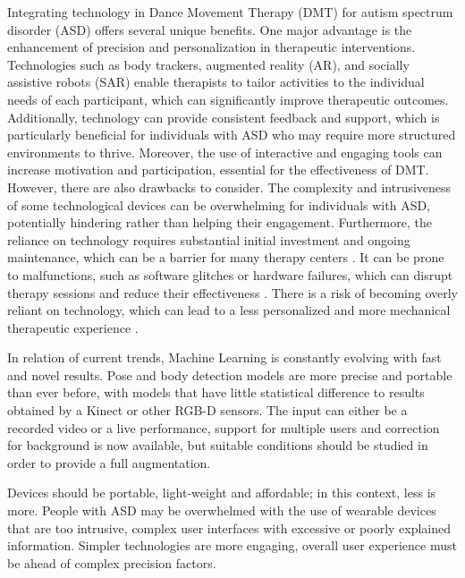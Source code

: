 \documentclass[a4paper,fleqn]{cas-sc}
\begin{document}
Integrating technology in Dance Movement Therapy (DMT) for autism spectrum disorder (ASD) offers several unique benefits. One major advantage is the enhancement of precision and personalization in therapeutic interventions. Technologies such as body trackers, augmented reality (AR), and socially assistive robots (SAR) enable therapists to tailor activities to the individual needs of each participant, which can significantly improve therapeutic outcomes. Additionally, technology can provide consistent feedback and support, which is particularly beneficial for individuals with ASD who may require more structured environments to thrive. Moreover, the use of interactive and engaging tools can increase motivation and participation, essential for the effectiveness of DMT. However, there are also drawbacks to consider. The complexity and intrusiveness of some technological devices can be overwhelming for individuals with ASD, potentially hindering rather than helping their engagement. Furthermore, the reliance on technology requires substantial initial investment and ongoing maintenance, which can be a barrier for many therapy centers \cite{Berenguer2020, Kouroupa2022}. It can be prone to malfunctions, such as software glitches or hardware failures, which can disrupt therapy sessions and reduce their effectiveness \cite{Boucenna2014}. There is a risk of becoming overly reliant on technology, which can lead to a less personalized and more mechanical therapeutic experience \cite{Maskey2014}.

In relation of current trends, Machine Learning is constantly evolving with fast and novel results. Pose and body detection models are more precise and portable than ever before, with models that have little statistical difference to results obtained by a Kinect or other RGB-D sensors. The input can either be a recorded video or a live performance, support for multiple users and correction for background is now available, but suitable conditions should be studied in order to provide a full augmentation.

Devices should be portable, light-weight and affordable; in this context, less is more. People with ASD may be overwhelmed with the use of wearable devices that are too intrusive, complex user interfaces with excessive or poorly explained information. Simpler technologies are more engaging, overall user experience must be ahead of complex precision factors.
\end{document}
